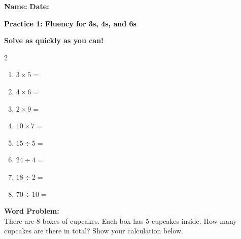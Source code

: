 \documentclass[12pt, letterpaper, fleqn]{article}
\newcommand{\blank}{\underline{\hspace{2.2cm}}}
\begin{document}
\textbf{Name:} \underline{\hspace{5cm}}
\hfill
\textbf{Date:} \underline{\hspace{3cm}}\\

\begin{tcolorbox}[colback=customteal!20]
    \large\textcolor{black}{\textbf{Practice 1: Fluency for 3s, 4s, and 6s}}
\end{tcolorbox}

\vspace{5mm}
\noindent
\textbf{Solve as quickly as you can!}

\vspace{5mm}
\begin{multicols}{2}
\begin{enumerate}[itemsep=1.2cm]
\item $3 \times 5 =$ \blank
\item $4 \times 6 =$ \blank
\item $2 \times 9 =$ \blank
\item $10 \times 7 =$ \blank
\item $15 \div 5 =$ \blank
\item $24 \div 4 =$ \blank
\item $18 \div 2 =$ \blank
\item $70 \div 10 =$ \blank
\end{enumerate}
\end{multicols}

\vspace{1.5cm}
\noindent
\textbf{Word Problem:}
\\
\noindent
There are 8 boxes of cupcakes. Each box has 5 cupcakes inside. How many cupcakes are there in total? Show your calculation below.
\vspace{3cm}
\end{document}
